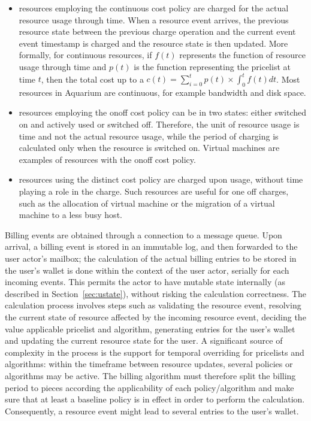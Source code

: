 \documentclass[preprint,10pt]{sigplanconf}
\begin{document}
\begin{itemize}
    \item resources employing the \textsf{continuous} cost policy are charged for
        the actual resource usage through time. When a resource event arrives,
        the previous resource state between the previous charge operation and the
        current event event timestamp is charged and the resource state is then
        updated. More formally, for continuous resources, if $f(t)$ represents
        the function of resource usage through time and $p(t)$ is the function
        representing the pricelist at time $t$, 
        then the total cost up to a 
        $c(t) = \sum_{i=0}^{t} {p(t) \times \int_0^{t}{f(t)dt}}$. Most resources
        in Aquarium are continuous, for example bandwidth and disk space.

    \item resources employing the \textsf{onoff} cost policy can be in two states:
        either switched on and actively used or switched off. Therefore, the unit
        of resource usage is time and not the actual resource usage, while the
        period of charging is calculated only when the resource is switched on.
        Virtual machines are examples of resources with the \textsf{onoff} cost
        policy.

    \item resources using the \textsf{distinct} cost policy are charged
        upon usage, without time playing a role in the charge. Such resources
        are useful for one off charges, such as the allocation of
        virtual machine or the migration of a virtual machine to a less busy
        host.

\end{itemize}

Billing events are obtained through a connection to a message queue. Upon
arrival, a billing event is stored in an immutable log, and then forwarded to
the user actor's mailbox; the calculation of the actual billing entries to be
stored in the user's wallet is done within the context of the user actor,
serially for each incoming events. This permits the actor to have mutable state
internally (as described in Section~\ref{sec:ustate}), without risking the
calculation correctness. The calculation process involves steps such as
validating the resource event, resolving the current state of resource affected
by the incoming resource event, deciding the value applicable pricelist and
algorithm, generating entries for the user's wallet and updating the current
resource state for the user. A significant source of complexity in the process
is the support for temporal overriding for pricelists and algorithms: within
the timeframe between resource updates, several policies or algorithms may be
active. The billing algorithm must therefore split the billing period to pieces
according the applicability of each policy/algorithm and make sure that at 
least a baseline policy is in effect in order to perform the calculation.
Consequently, a resource event might lead to several entries to the user's wallet.
\end{document}
